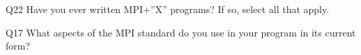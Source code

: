 \begin{description}%
\item{Q22} Have you ever written MPI+”X” programs? If so, select all that apply.%
\item{Q17} What aspects of the MPI standard do you use in your program in its current form?%
\end{description}%
